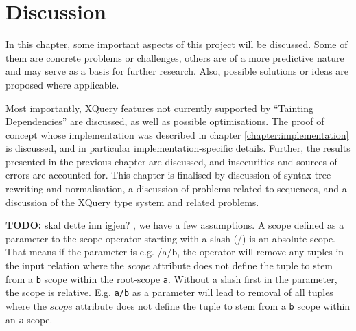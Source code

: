 \chapter{Discussion}
\label{chapter:discussion}
In this chapter, some important aspects of this project will be discussed. Some
of them are concrete problems or challenges, others are of a more predictive
nature and may serve as a basis for further research. Also, possible
solutions or ideas are proposed where applicable. 

Most importantly, XQuery features not
currently supported by ``Tainting Dependencies'' are discussed, as well as
possible optimisations. The proof of concept whose implementation was
described in chapter \ref{chapter:implementation} is discussed, and in
particular implementation-specific details. Further, the results presented in
the previous chapter are discussed, and insecurities and sources of errors are
accounted for. This chapter is finalised by discussion of syntax tree rewriting
and normalisation, a discussion of problems related to sequences, and a
discussion of the XQuery type system and related problems.

\textbf{\LARGE TODO:} skal dette inn igjen?
, we have a few assumptions. A scope defined as a parameter to
the \textsf{scope}-operator starting with a slash (\textsf{/}) is an absolute scope. That means if the parameter
is e.g. \textsf{/a/b}, the operator will remove any tuples in the input relation where the $scope$ attribute does
not define the tuple to stem from a \texttt{b} scope within the root-scope \texttt{a}. Without a slash first in
the parameter, the scope is relative. E.g. \texttt{a/b} as a parameter will lead to removal of all tuples where
the $scope$ attribute does not define the tuple to stem from a \texttt{b} scope within an \texttt{a} scope.










